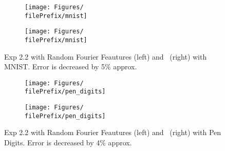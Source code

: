 \begin{figure}[H]
  \centering
  \renewcommand{\filePrefix}{\undPrefix/rff}
  \begin{subfigure}[t]{0.5\linewidth}
    \centering\captionsetup{width=.8\linewidth}\texttt{[image: Figures/\\filePrefix/mnist]}
    \label{fig:\undPrefix_mnist}
  \end{subfigure}%
  \renewcommand{\filePrefix}{\undPrefix/nys}%
  \begin{subfigure}[t]{0.5\linewidth}
    \centering\captionsetup{width=.8\linewidth}\texttt{[image: Figures/\\filePrefix/mnist]}
    \label{fig:\undPrefix_mnist}
  \end{subfigure}
  \caption*{Exp 2.2 with Random Fourier Feautures (left) and \Nys\ (right)
   with MNIST. Error is decreased by 5\% approx.}
\end{figure}


\begin{figure}[H]
  \centering
  \renewcommand{\filePrefix}{\undPrefix/rff}
  \begin{subfigure}[t]{0.5\linewidth}
    \centering\captionsetup{width=.8\linewidth}\texttt{[image: Figures/\\filePrefix/pen\_digits]}
    \label{fig:\undPrefix_pen_digits}
  \end{subfigure}%
  \renewcommand{\filePrefix}{\undPrefix/nys}%
  \begin{subfigure}[t]{0.5\linewidth}
    \centering\captionsetup{width=.8\linewidth}\texttt{[image: Figures/\\filePrefix/pen\_digits]}
    \label{fig:\undPrefix_pen_digits}
  \end{subfigure}%
  \caption*{Exp 2.2 with Random Fourier Feautures (left) and \Nys\ (right)
   with Pen Digits. Error is decreased by 4\% approx.}
\end{figure}


